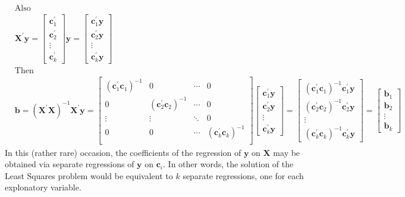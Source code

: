 \documentclass[11pt,reqno]{article}   %
\newcommand{\mlt}[1]{\mathbf{#1}} %
\newcommand{\kl}{\left(}
\newcommand{\kr}{\right)}
\newcommand{\kt}{^{\prime}}
\newcommand{\kX}{\mlt{X}}
\newcommand{\ky}{\mlt{y}}
\newcommand{\kb}{\mlt{b}}
\newcommand{\kc}{\mlt{c}}
\begin{document}
\begin{equation}
\begin{split}
& \text{Also} \\ 
& \kX\kt\ky = \begin{bmatrix} \kc_1\kt \\ \kc_2\kt \\ \vdots \\ \kc_k\kt\end{bmatrix} \ky = \begin{bmatrix} \kc_1\kt\ky \\ \kc_2\kt\ky \\ \vdots \\ \kc_k\kt\ky\end{bmatrix} \\ 
& \text{Then} \\
& \kb = \kl \kX\kt\kX \kr^{-1}\kX\kt\ky = \begin{bmatrix}
(\kc_1\kt\kc_1)^{-1} & 0 & \cdots & 0 \\ 
0 & (\kc_2\kt\kc_2)^{-1} & \cdots & 0 \\ 
\vdots & \vdots & \ddots & 0 \\ 
0 & 0 & \cdots & (\kc_k\kt\kc_k)^{-1} \\ 
\end{bmatrix} \begin{bmatrix} \kc_1\kt\ky \\ \kc_2\kt\ky \\ \vdots \\ \kc_k\kt\ky\end{bmatrix} = \begin{bmatrix} (\kc_1\kt\kc_1)^{-1}\kc_1\kt\ky \\ (\kc_2\kt\kc_2)^{-1}\kc_2\kt\ky \\ \vdots \\ (\kc_k\kt\kc_k)^{-1}\kc_k\kt\ky\end{bmatrix} = \begin{bmatrix} \kb_1 \\ \kb_2 \\ \vdots \\ \kb_k\end{bmatrix}
\end{split}
\end{equation}
In this (rather rare) occasion, the coefficients of the regression of $\ky$ on $\kX$ may be obtained via separate regressions of $\ky$ on $\kc_i$. In other words, the solution of the Least Squares problem would be equivalent to $k$ separate regressions, one for each explonatory variable. 
\end{document}
